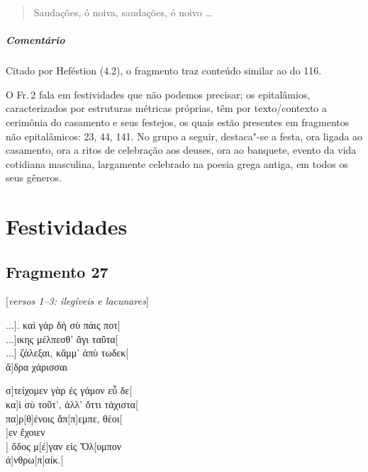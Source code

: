 \begin{verse}
Saudações, ó noiva, saudações, ó noivo \ldots{}
\end{verse}

\medskip

\paragraph{Comentário} Citado por Heféstion (4.2), o fragmento traz conteúdo similar ao do 116.

\begin{argumento}
O Fr.\,2 fala em festividades que não podemos precisar; os epitalâmios,
caracterizados por estruturas métricas próprias, têm por texto/contexto a
cerimônia do casamento e seus festejos, os quais estão presentes em fragmentos não epitalâmicos: 23, 44, 141. No grupo a seguir, destaca"-se a festa,
ora ligada ao casamento, ora a ritos de celebração aos deuses, ora ao banquete,
evento da vida cotidiana masculina, largamente celebrado na poesia grega
antiga, em todos os seus gêneros.
\end{argumento}

\chapter{Festividades}

\section{Fragmento 27}

\begin{gkverse}
\textnormal{[\emph{versos 1--3: ilegíveis e lacunares}]}

...]. καὶ γὰρ δὴ σὺ πάις ποτ[\\
...]ικης μέλπεσθ’ ἄγι ταῦτα[\\
...] ζάλεξαι, κἄμμ’ ἀπὺ τωδεκ[\\
ἄ]δρα χάρισσαι

σ]τείχομεν γὰρ ἐς γάμον εὖ δε[\\
κα]ὶ σὺ τοῦτ’, ἀλλ’ ὄττι τάχιστα[\\
πα]ρ[θ]ένοις ἄπ[π]εμπε, θέοι[\\
]εν ἔχοιεν\\
      ] ὄδος μ[έ]γαν εἰς Ὄλ[υμπον\\
       ἀ]νθρω[π\qquad]αίκ.[
\end{gkverse}


